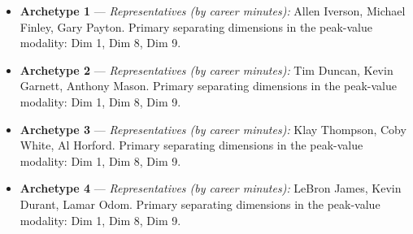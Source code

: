 \begin{itemize}
\item \textbf{Archetype 1} --- \emph{Representatives (by career minutes):} Allen Iverson, Michael Finley, Gary Payton. Primary separating dimensions in the peak-value modality: Dim 1, Dim 8, Dim 9.
\item \textbf{Archetype 2} --- \emph{Representatives (by career minutes):} Tim Duncan, Kevin Garnett, Anthony Mason. Primary separating dimensions in the peak-value modality: Dim 1, Dim 8, Dim 9.
\item \textbf{Archetype 3} --- \emph{Representatives (by career minutes):} Klay Thompson, Coby White, Al Horford. Primary separating dimensions in the peak-value modality: Dim 1, Dim 8, Dim 9.
\item \textbf{Archetype 4} --- \emph{Representatives (by career minutes):} LeBron James, Kevin Durant, Lamar Odom. Primary separating dimensions in the peak-value modality: Dim 1, Dim 8, Dim 9.
\end{itemize}
